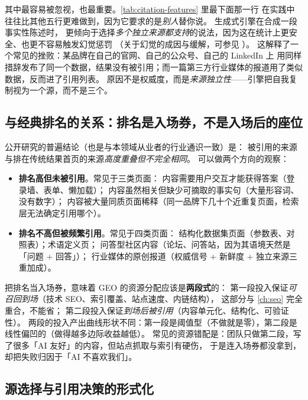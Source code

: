 其中最容易被忽视，也最重要。\cref{tab:citation-features} 里最下面那一行
在实践中往往比其他五行更难做到，因为它要求的是\emph{别人}替你说。
生成式引擎在合成一段事实性陈述时，
更倾向于选择\emph{多个独立来源都支持}的说法，因为这在统计上更安全、也更不容易触发幻觉惩罚
（关于幻觉的成因与缓解，可参见 \cite{ji2023hallucination}）。
这解释了一个常见的挫败：某品牌在自己的官网、自己的公众号、自己的 LinkedIn 上
用同样措辞发布了同一个数据，结果没有被引用；而一篇第三方行业媒体的报道用了类似数据，反而进了引用列表。
原因不是权威度，而是\emph{来源独立性}——引擎把自我复制视为一个源，而不是三个。

\subsection{与经典排名的关系：排名是入场券，不是入场后的座位}
\label{sec:geo-ranking-relation}

公开研究的普遍结论（也是与本领域从业者的行业通识一致）是：
被引用的来源与排在传统结果首页的来源\emph{高度重叠但不完全相同}。
可以做两个方向的观察：

\begin{itemize}
  \item \textbf{排名高但未被引用}。常见于三类页面：
        内容需要用户交互才能获得答案（登录墙、表单、懒加载）；
        内容虽然相关但缺少可摘取的事实句（大量形容词、没有数字）；
        内容被大量同质页面稀释（同一品牌下几十个近重复页面，检索层无法确定引用哪个）。
  \item \textbf{排名不高但被频繁引用}。常见于四类页面：
        结构化数据集页面（参数表、对照表）；术语定义页；
        问答型社区内容（论坛、问答站，因为其语境天然是「问题 + 回答」）；
        行业媒体的原创报道（权威信号 + 新鲜度 + 独立来源三重加成）。
\end{itemize}

\begin{insight}
把排名当入场券，意味着 GEO 的资源分配应该是\textbf{两段式}的：
第一段投入保证\emph{可召回到场}（技术 SEO、索引覆盖、站点速度、内链结构），
这部分与 \cref{ch:seo} 完全重合，不能省；
第二段投入保证\emph{到场后被引用}（内容单元化、结构化、可验证性）。
两段的投入产出曲线形状不同：第一段是阈值型（不做就是零），第二段是线性偏凹的（做得越多边际收益越低）。
常见的资源错配是：团队只做第二段，写了很多「AI 友好」的内容，但站点抓取与索引有硬伤，
于是连入场券都没拿到，却把失败归因于「AI 不喜欢我们」。
\end{insight}

\subsection{源选择与引用决策的形式化}

